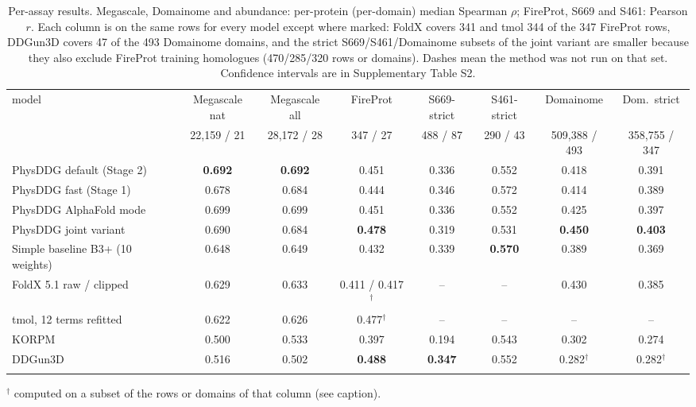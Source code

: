 \documentclass[unnumsec,webpdf,contemporary,large]{oup-authoring-template}
\begin{document}
\begin{table}[t]
\caption{Per-assay results. Megascale, Domainome and abundance: per-protein (per-domain) median Spearman $\rho$;
FireProt, S669 and S461: Pearson $r$. Each column is on the same rows for every model except where marked:
FoldX covers 341 and tmol 344 of the 347 FireProt rows, DDGun3D covers 47 of the 493 Domainome domains, and
the strict S669/S461/Domainome subsets of the joint variant are smaller because they also exclude FireProt
training homologues (470/285/320 rows or domains). Dashes mean the method was not run on that set. Confidence
intervals are in Supplementary Table S2.}
\label{tab:assays}
\small
\begin{tabular*}{\textwidth}{@{\extracolsep\fill}lccccccc@{}}
\toprule
model & Megascale nat & Megascale all & FireProt & S669-strict & S461-strict & Domainome & Dom.\ strict \\
 & 22,159 / 21 & 28,172 / 28 & 347 / 27 & 488 / 87 & 290 / 43 & 509,388 / 493 & 358,755 / 347 \\
\midrule
PhysDDG default (Stage 2) & \textbf{0.692} & \textbf{0.692} & 0.451 & 0.336 & 0.552 & 0.418 & 0.391 \\
PhysDDG fast (Stage 1) & 0.678 & 0.684 & 0.444 & 0.346 & 0.572 & 0.414 & 0.389 \\
PhysDDG AlphaFold mode & 0.699 & 0.699 & 0.451 & 0.336 & 0.552 & 0.425 & 0.397 \\
PhysDDG joint variant & 0.690 & 0.684 & \textbf{0.478} & 0.319 & 0.531 & \textbf{0.450} & \textbf{0.403} \\
Simple baseline B3+ (10 weights) & 0.648 & 0.649 & 0.432 & 0.339 & \textbf{0.570} & 0.389 & 0.369 \\
FoldX 5.1 raw / clipped & 0.629 & 0.633 & 0.411 / 0.417$^{\dagger}$ & -- & -- & 0.430 & 0.385 \\
tmol, 12 terms refitted & 0.622 & 0.626 & 0.477$^{\dagger}$ & -- & -- & -- & -- \\
KORPM & 0.500 & 0.533 & 0.397 & 0.194 & 0.543 & 0.302 & 0.274 \\
DDGun3D & 0.516 & 0.502 & \textbf{0.488} & \textbf{0.347} & 0.552 & 0.282$^{\dagger}$ & 0.282$^{\dagger}$ \\
\botrule
\end{tabular*}
\begin{tablenotes}
\item $^{\dagger}$ computed on a subset of the rows or domains of that column (see caption).
\end{tablenotes}
\end{table}
\end{document}
